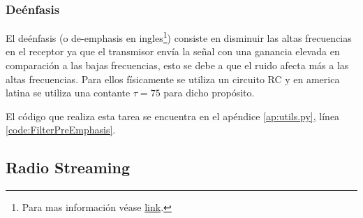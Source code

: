 \subsubsection{Deénfasis}
El deénfasis (o de-emphasis en ingles\footnote{Para mas información véase \href{https://en.wikipedia.org/wiki/FM\_broadcasting\#Pre-emphasis\_and_de-emphasis}{link}.}) consiste en disminuir las altas frecuencias en el receptor ya que el transmisor envía la señal con una ganancia elevada en comparación a las bajas frecuencias, esto se debe a que el ruido afecta más a las altas frecuencias.
Para ellos físicamente se utiliza un circuito RC y en america latina se utiliza una contante $\tau = 75$ para dicho propósito.

El código que realiza esta tarea se encuentra en el apéndice \ref{ap:utils.py}, línea \ref{code:FilterPreEmphasis}.

\newpage

\subsection{Radio Streaming}


